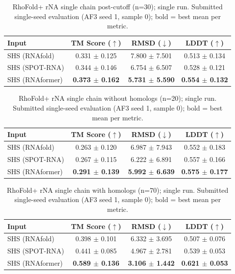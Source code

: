 \begin{table}[htbp]
\centering
\caption{RhoFold+ rNA single chain post-cutoff (n=30); single run. Submitted single-seed evaluation (AF3 seed 1, sample 0); bold = best mean per metric.}
\label{tab:rf_rna_single_chain_post_cutoff}
\begin{tabular}{lccc}
\toprule
Input & TM Score ($\uparrow$) & RMSD ($\downarrow$) & LDDT ($\uparrow$) \\
\midrule
SHS (RNAfold) & 0.331 $\pm$ 0.125 & 7.800 $\pm$ 7.501 & 0.513 $\pm$ 0.134 \\
SHS (SPOT-RNA) & 0.344 $\pm$ 0.146 & 6.754 $\pm$ 6.507 & 0.528 $\pm$ 0.121 \\
SHS (RNAformer) & \textbf{0.373 $\pm$ 0.162} & \textbf{5.731 $\pm$ 5.590} & \textbf{0.554 $\pm$ 0.132} \\
\bottomrule
\end{tabular}
\end{table}

\begin{table}[htbp]
\centering
\caption{RhoFold+ rNA single chain without homologs (n=20); single run. Submitted single-seed evaluation (AF3 seed 1, sample 0); bold = best mean per metric.}
\label{tab:rf_rna_single_chain_without_homologs}
\begin{tabular}{lccc}
\toprule
Input & TM Score ($\uparrow$) & RMSD ($\downarrow$) & LDDT ($\uparrow$) \\
\midrule
SHS (RNAfold) & 0.263 $\pm$ 0.120 & 6.987 $\pm$ 7.943 & 0.552 $\pm$ 0.183 \\
SHS (SPOT-RNA) & 0.267 $\pm$ 0.115 & 6.222 $\pm$ 6.891 & 0.557 $\pm$ 0.166 \\
SHS (RNAformer) & \textbf{0.291 $\pm$ 0.139} & \textbf{5.992 $\pm$ 6.639} & \textbf{0.575 $\pm$ 0.177} \\
\bottomrule
\end{tabular}
\end{table}

\begin{table}[htbp]
\centering
\caption{RhoFold+ rNA single chain with homologs (n=70); single run. Submitted single-seed evaluation (AF3 seed 1, sample 0); bold = best mean per metric.}
\label{tab:rf_rna_single_chain_with_homologs}
\begin{tabular}{lccc}
\toprule
Input & TM Score ($\uparrow$) & RMSD ($\downarrow$) & LDDT ($\uparrow$) \\
\midrule
SHS (RNAfold) & 0.398 $\pm$ 0.101 & 6.332 $\pm$ 3.695 & 0.507 $\pm$ 0.076 \\
SHS (SPOT-RNA) & 0.441 $\pm$ 0.085 & 4.967 $\pm$ 2.781 & 0.539 $\pm$ 0.053 \\
SHS (RNAformer) & \textbf{0.589 $\pm$ 0.136} & \textbf{3.106 $\pm$ 1.442} & \textbf{0.621 $\pm$ 0.053} \\
\bottomrule
\end{tabular}
\end{table}

